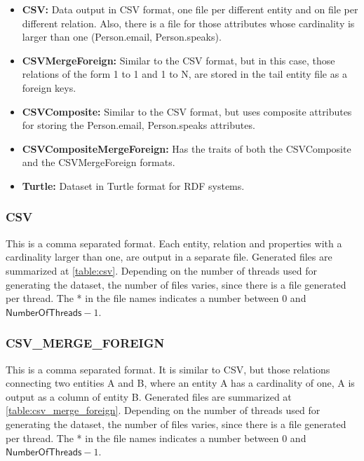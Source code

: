 \begin{itemize}
  \item \textbf{CSV:} Data output in CSV format, one file per different entity and on file
    per different relation. Also, there is a file for those attributes whose
    cardinality is larger than one (\ie Person.email, Person.speaks).
  \item \textbf{CSVMergeForeign:} Similar to the CSV format, but in this case, those
    relations of the form 1 to 1 and 1 to N, are stored in the tail entity file as
    a foreign keys.
  \item \textbf{CSVComposite:} Similar to the CSV format, but uses composite attributes for storing the Person.email, Person.speaks attributes.
  \item \textbf{CSVCompositeMergeForeign:} Has the traits of both the CSVComposite and the CSVMergeForeign formats.
  \item \textbf{Turtle:} Dataset in Turtle format for RDF systems.
\end{itemize}



\subsubsection{CSV}

This is a comma separated format. Each entity, relation and properties with a
cardinality larger than one, are output in a separate file. Generated files are
summarized at \autoref{table:csv}.  Depending on the number of threads used
for generating the dataset, the number of files varies, since there is a file
generated per thread. The * in the file names indicates a number between 0 and
$\mathsf{NumberOfThreads}-1$.




\subsubsection{CSV\_MERGE\_FOREIGN}

This is a comma separated format. It is similar to CSV, but those relations
connecting two entities A and B, where an entity A has a cardinality of one, A
is output as a column of entity B. Generated files are summarized at
\autoref{table:csv_merge_foreign}. Depending on the number of threads used for generating
the dataset, the number of files varies, since there is a file generated per
thread. The * in the file names indicates a number between 0 and $\mathsf{NumberOfThreads}-1$.

